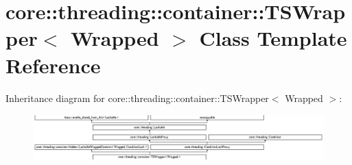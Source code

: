 \hypertarget{classcore_1_1threading_1_1container_1_1_t_s_wrapper}{\section{core\-:\-:threading\-:\-:container\-:\-:T\-S\-Wrapper$<$ Wrapped $>$ Class Template Reference}
\label{classcore_1_1threading_1_1container_1_1_t_s_wrapper}
}
Inheritance diagram for core\-:\-:threading\-:\-:container\-:\-:T\-S\-Wrapper$<$ Wrapped $>$\-:\begin{figure}[H]
\begin{center}
\leavevmode
\includegraphics[height=1.764335cm]{classcore_1_1threading_1_1container_1_1_t_s_wrapper}
\end{center}
\end{figure}
